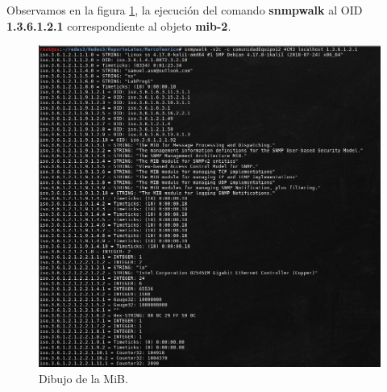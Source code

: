 \begin{enumerate}
Observamos en la figura \ref{image:dibujoMib}, la ejecución del comando \textbf{snmpwalk} al OID \textbf{1.3.6.1.2.1} correspondiente al objeto \textbf{mib-2}.
\FloatBarrier
\begin{figure}[htbp!]
		\centering
	\includegraphics[width=.9 \textwidth]{images/dibujoMib}
		\caption{Dibujo de la MiB.}
\label{image:dibujoMib}
\end{figure}
\FloatBarrier
\end{enumerate}